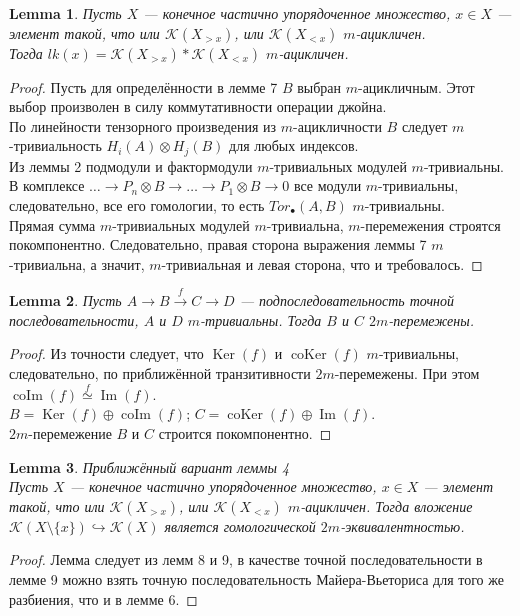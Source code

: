 \documentclass[a4paper, 12pt]{article}
\newtheorem{lemma}{Lemma}
\theoremstyle{definition}
\theoremstyle{remark}
\begin{document}
\begin{lemma}
  Пусть $X$ --- конечное частично упорядоченное множество, $x \in X$ --- элемент такой, что или $\mathcal{K}(X_{>x})$, или $\mathcal{K}(X_{<x})$ $m$-ацикличен.\\
  Тогда $lk(x) = \mathcal{K}(X_{>x}) * \mathcal{K}(X_{<x})$ $m$-ацикличен.
\end{lemma}
\begin{proof}
  Пусть для определённости в лемме 7 $B$ выбран $m$-ацикличным. Этот выбор произволен в силу коммутативности операции джойна.\\
  По линейности тензорного произведения из $m$-ацикличности $B$ следует $m$-тривиальность $H_i(A) \otimes H_j(B)$ для любых индексов.\\
  Из леммы 2 подмодули и фактормодули $m$-тривиальных модулей $m$-тривиальны.\\
  В комплексе $\ldots \to P_n \otimes B \to \ldots \to P_1 \otimes B \to 0$ все модули $m$-тривиальны, следовательно, все его гомологии, то есть $Tor_{\bullet}(A,B)$ $m$-тривиальны.\\
  Прямая сумма $m$-тривиальных модулей $m$-тривиальна, $m$-перемежения строятся покомпонентно. Следовательно, правая сторона выражения леммы 7 $m$-тривиальна, а значит, $m$-тривиальная и левая сторона, что и требовалось.
\end{proof}

\begin{lemma}
  Пусть $A \to B \xrightarrow{f} C \to D$ --- подпоследовательность точной последовательности, $A$ и $D$ $m$-тривиальны. Тогда $B$ и $C$ $2m$-перемежены.
\end{lemma}
\begin{proof}
  Из точности следует, что $\operatorname{Ker}(f)$ и $\operatorname{coKer}(f)$ $m$-тривиальны, следовательно, по приближённой транзитивности $2m$-перемежены. При этом $\operatorname{coIm}(f) \stackrel{f}{\simeq} \operatorname{Im}(f)$.\\
  $B = \operatorname{Ker}(f) \oplus \operatorname{coIm}(f)$; $C = \operatorname{coKer}(f) \oplus \operatorname{Im}(f)$.\\
  $2m$-перемежение $B$ и $C$ строится покомпонентно.
\end{proof}

\begin{lemma}
  \textit{Приближённый вариант леммы 4}\\
  Пусть $X$ --- конечное частично упорядоченное множество, $x \in X$ --- элемент такой, что или $\mathcal{K}(X_{>x})$, или $\mathcal{K}(X_{<x})$ $m$-ацикличен. Тогда вложение $\mathcal{K}(X\setminus \{x\}) \hookrightarrow \mathcal{K}(X)$ является гомологической $2m$-эквивалентностью.
\end{lemma}
\begin{proof}
  Лемма следует из лемм 8 и 9, в качестве точной последовательности в лемме 9 можно взять точную последовательность Майера-Вьеториса для того же разбиения, что и в лемме 6.
\end{proof}
\end{document}
